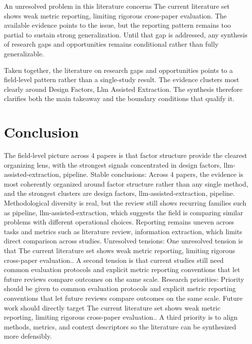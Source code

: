\documentclass{article}
\begin{document}
An unresolved problem in this literature concerns The current literature set shows weak metric reporting, limiting rigorous cross-paper evaluation. The available evidence points to the issue, but the reporting pattern remains too partial to sustain strong generalization. Until that gap is addressed, any synthesis of research gaps and opportunities remains conditional rather than fully generalizable. \cite{08_2016_zhou_aap,09_2018_jiang_aap}

Taken together, the literature on research gaps and opportunities points to a field-level pattern rather than a single-study result. The evidence clusters most clearly around Design Factors, Llm Assisted Extraction. The synthesis therefore clarifies both the main takeaway and the boundary conditions that qualify it. \cite{08_2016_zhou_aap,09_2018_jiang_aap}

\section{Conclusion}
The field-level picture across 4 papers is that factor structure provide the clearest organizing lens, with the strongest signals concentrated in design factors, llm-assisted-extraction, pipeline. Stable conclusions: Across 4 papers, the evidence is most coherently organized around factor structure rather than any single method, and the strongest clusters are design factors, llm-assisted-extraction, pipeline. Methodological diversity is real, but the review still shows recurring families such as pipeline, llm-assisted-extraction, which suggests the field is comparing similar problems with different operational choices. Reporting remains uneven across tasks and metrics such as literature review, information extraction, which limits direct comparison across studies. Unresolved tensions: One unresolved tension is that The current literature set shows weak metric reporting, limiting rigorous cross-paper evaluation.. A second tension is that current studies still need common evaluation protocols and explicit metric reporting conventions that let future reviews compare outcomes on the same scale. Research priorities: Priority should be given to common evaluation protocols and explicit metric reporting conventions that let future reviews compare outcomes on the same scale. Future work should directly target The current literature set shows weak metric reporting, limiting rigorous cross-paper evaluation.. A third priority is to align methods, metrics, and context descriptors so the literature can be synthesized more defensibly. \cite{08_2016_zhou_aap}
\end{document}
